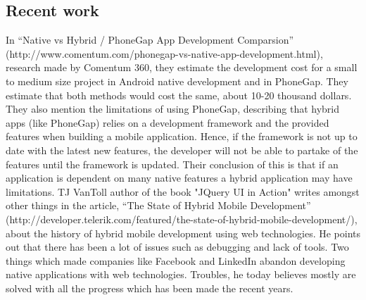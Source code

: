 \subsection{Recent work}
In “Native vs Hybrid / PhoneGap App Development Comparsion” (http://www.comentum.com/phonegap-vs-native-app-development.html), research made by Comentum 360, they estimate the development cost for a small to medium size project in Android native development and in PhoneGap. They estimate that both methods would cost the same, about 10-20 thousand dollars. They also mention the limitations of using PhoneGap, describing that hybrid apps (like PhoneGap) relies on a development framework and the provided features when building a mobile application. Hence, if the framework is not up to date with the latest new features, the developer will not be able to partake of the features until the framework is updated. Their conclusion of this is that if an application is dependent on many native features a hybrid application may have limitations. 
\newline
\newline
TJ VanToll author of the book "JQuery UI in Action" writes amongst other things in the article, “The State of Hybrid Mobile Development” (http://developer.telerik.com/featured/the-state-of-hybrid-mobile-development/), about the history of hybrid mobile development using web technologies. He points out that there has been a lot of issues such as debugging and lack of tools. Two things which made companies like Facebook and LinkedIn abandon developing native applications with web technologies. Troubles, he today believes mostly are solved with all the progress which has been made the recent years.